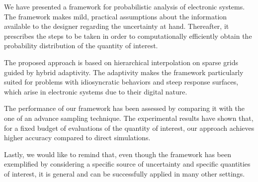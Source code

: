 We have presented a framework for probabilistic analysis of electronic systems.
The framework makes mild, practical assumptions about the information available
to the designer regarding the uncertainty at hand. Thereafter, it prescribes the
steps to be taken in order to computationally efficiently obtain the probability
distribution of the quantity of interest.

The proposed approach is based on hierarchical interpolation on sparse grids
guided by hybrid adaptivity. The adaptivity makes the framework particularly
suited for problems with idiosyncratic behaviors and steep response surfaces,
which arise in electronic systems due to their digital nature.

The performance of our framework has been assessed by comparing it with the one
of an advance sampling technique. The experimental results have shown that, for
a fixed budget of evaluations of the quantity of interest, our approach achieves
higher accuracy compared to direct simulations.

Lastly, we would like to remind that, even though the framework has been
exemplified by considering a specific source of uncertainty and specific
quantities of interest, it is general and can be successfully applied in many
other settings.
